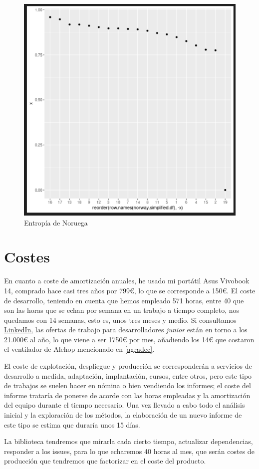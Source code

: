 \begin{figure}[h!]
    \centering
     \includegraphics[width=\textwidth]{./img/norwayentrop.png}
     \caption{Entropía de Noruega}
     \label{img:red:eng:nor}
\end{figure}


\section{Costes}


En cuanto a coste de amortización anuales, he usado mi portátil Asus Vivobook 14, comprado hace casi tres 
años por 799€, lo que se corresponde a 150€. El coste de desarrollo, teniendo en cuenta que 
hemos empleado 571 horas, entre 40 que son las horas que se echan por semana en un trabajo a 
tiempo completo, nos quedamos con 14 semanas, esto es, unos tres meses y medio. Si consultamos 
\href{https://www.linkedin.com/feed/}{LinkedIn}, las ofertas de trabajo para desarrolladores 
\textit{junior} están en torno a los 21.000€ al año, lo que viene a ser 1750€ por mes, añadiendo los 14€ 
que costaron el ventilador de Alehop mencionado en \ref{agradec}.

El coste de explotación, despliegue y producción se corresponderán a servicios de 
desarrollo a medida, adaptación, implantación, cursos, entre otros, pero este
tipo de trabajos se suelen hacer en nómina o bien vendiendo los informes; el
coste del informe trataría de ponerse de acorde con las horas empleadas y la
amortización del equipo durante el tiempo necesario. Una vez llevado a cabo todo
el análisis inicial y la exploración de los métodos, la elaboración de un nuevo
informe de este tipo se estima que duraría unos 15 días.

La biblioteca tendremos que 
mirarla cada cierto tiempo, actualizar dependencias, responder a los issues, para lo que echaremos 
40 horas al mes, que serán costes de producción que tendremos que factorizar en el coste del producto.
